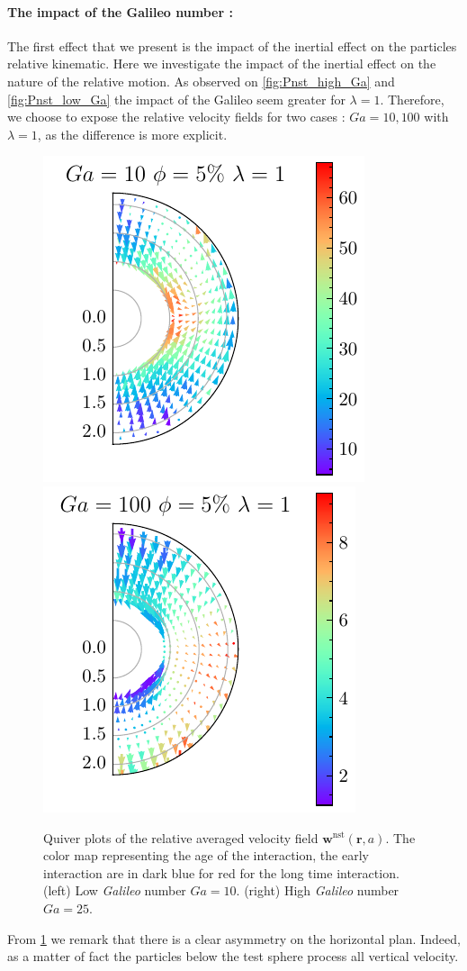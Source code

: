 \paragraph*{The impact of the Galileo number : }
The first effect that we present is the impact of the inertial effect on the particles relative kinematic. 
Here we investigate the impact of the inertial effect on the nature of the relative motion. 
As observed on \ref{fig:Pnst_high_Ga} and \ref{fig:Pnst_low_Ga} the impact of the Galileo seem greater for $\lambda=1$.
Therefore, we choose to expose the relative velocity fields for two cases : $Ga=10,100$ with $\lambda=1$, as the difference is more explicit. 
\begin{figure}[h!]
    \centering
    \includegraphics[height=0.3\textwidth]{image/HOMOGENEOUS_NEW/Dist/U_rel_l_1_Ga_10_PHI_5.pdf}
    \includegraphics[height=0.3\textwidth]{image/HOMOGENEOUS_NEW/Dist/U_rel_l_1_Ga_100_PHI_5.pdf}
    \caption{Quiver plots of the relative averaged velocity field $\textbf{w}^\text{nst}(\textbf{r},a)$.
    The color map representing the age of the interaction, the early interaction are in dark blue for red for the long time interaction.
    (left) Low \textit{Galileo} number $Ga = 10$.
    (right) High \textit{Galileo} number $Ga = 25$. }
    \label{fig:Why_Ga_matter}
\end{figure}
From \ref{fig:Why_Ga_matter}  we remark that there is a clear asymmetry on the horizontal plan. 
Indeed, as a matter of fact the particles below the test sphere process all vertical velocity. 
